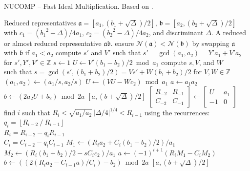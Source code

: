 \documentclass{ucalgthes1}
\theoremstyle{definition}
\newcommand{\ZZ}{\mathbb{Z}}
\newcommand{\matrixtt}[4]{\left[ \begin{array}{rr} #1 & #2 \\ #3 & #4 \end{array} \right]}
\newcommand{\floor}[1]{\left\lfloor #1 \right\rfloor}
\begin{document}
\begin{algorithm}[htb]
\caption{NUCOMP -- Fast Ideal Multiplication. Based on \cite[pp.441-443]{Jacobson2009}.}
\label{alg:nucomp}
\begin{algorithmic}[1]
\REQUIRE Reduced representatives $\mathfrak a = [a_1, (b_1+\sqrt\Delta)/2]$, $\mathfrak b = [a_2, (b_2+\sqrt\Delta)/2]$ \\ with $c_1 = ({b_1}^2-\Delta)/4a_1$, $c_2 = ({b_2}^2-\Delta)/4a_2$, and discriminant $\Delta$.
\ENSURE A reduced or almost reduced representative $\mathfrak a \mathfrak b$.
\STATE ensure $\mathcal N(\mathfrak a) < \mathcal N(\mathfrak b)$ by swapping $\mathfrak a$ with $\mathfrak b$ if $a_1 < a_2$
\STATE compute $s'$ and $V'$ such that $s' = \gcd(a_1, a_2) = Y'a_1 + V'a_2$ for $s', Y', V' \in \ZZ$
\STATE $s \gets 1$
\STATE $U \gets V'(b_1 - b_2)/2 \bmod a_1$
	\STATE compute $s, V$, and $W$ \\
	       such that $s = \gcd(s', (b_1 + b_2)/2) = Vs' + W(b_1 + b_2)/2$ for $V, W \in \ZZ$
	\STATE $(a_1, a_2) \gets (a_1/s, a_2/s)$
	\STATE $U \gets (VU - Wc_2) \bmod a_1$
\ENDIF
{}
	\STATE $a \gets a_1a_2$
	\STATE $b \gets (2a_2U + b_2) \bmod{2a}$
	\RETURN $[a, (b+\sqrt\Delta)/2]$
\ENDIF
\STATE $\matrixtt{R_{-2}}{R_{-1}}{C_{-2}}{C_{-1}} \gets \matrixtt{U}{a_1}{-1}{0}$
\STATE find $i$ such that $R_i < \sqrt{a_1/a_2} ~ |\Delta/4|^{1/4} < R_{i-1}$ using the recurrences: \\
$q_i = \floor{R_{i-2} ~/~ R_{i-1}}$ \\
$R_i = R_{i-2}-q_i R_{i-1}$ \\
$C_i=C_{i-2}-q_i C_{i-1}$
\STATE $M_1 \gets (R_i a_2 + C_i(b_1-b_2)/2)/a_1$
\STATE $M_2 \gets (R_i (b_1+b_2)/2 -sC_i c_2)/a_1$
\STATE $a \gets (-1)^{i+1}(R_i M_1 - C_i M_2)$
\STATE $b \gets ((2(R_i a_2 - C_{i-1} a)/C_i) - b_2) \bmod{2a}$
\RETURN $[a, (b+\sqrt\Delta)/2]$
\end{algorithmic}
\end{algorithm}
\end{document}
